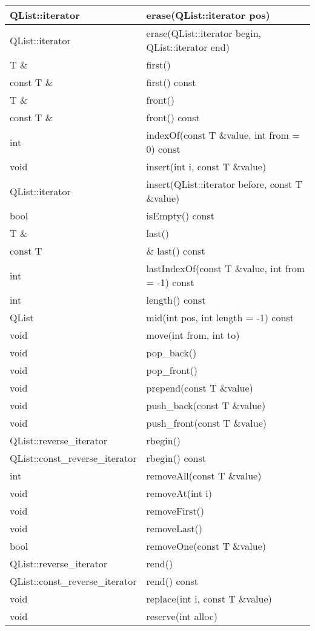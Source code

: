 \begin{longtable}{|l|m{25em}|}
\hline
QList::iterator &	erase(QList::iterator pos)\\
\hline
QList::iterator &	erase(QList::iterator begin, QList::iterator
                  end)\\
\hline
T \& &	first()\\
\hline
const T \& &	first() const\\
\hline
T \& &	front()\\
\hline
const T \& & 	front() const\\
\hline
int &	indexOf(const T \&value, int from = 0) const\\
\hline
void &	insert(int i, const T \&value)\\
\hline
QList::iterator& 	insert(QList::iterator before, const T \&value)\\
\hline
bool 	&isEmpty() const\\
\hline
T \& &	last()\\
\hline
const T& \& 	last() const\\
\hline
int &	lastIndexOf(const T \&value, int from = -1) const\\
\hline
int 	&length() const\\
\hline
QList& 	mid(int pos, int length = -1) const\\
\hline
void& 	move(int from, int to)\\
\hline
void& 	pop\_back()\\
\hline
void& 	pop\_front()\\
\hline
void& 	prepend(const T \&value)\\
\hline
void& 	push\_back(const T \&value)\\
\hline
void& 	push\_front(const T \&value)\\
\hline
QList::reverse\_iterator &	rbegin()\\
\hline
QList::const\_reverse\_iterator &	rbegin() const\\
\hline
int& 	removeAll(const T \&value)\\
\hline
void& 	removeAt(int i)\\
\hline
void& 	removeFirst()\\
\hline
void& 	removeLast()\\
\hline
bool& 	removeOne(const T \&value)\\
\hline
QList::reverse\_iterator &	rend()\\
\hline
QList::const\_reverse\_iterator &	rend() const\\
\hline
void& 	replace(int i, const T \&value)\\
\hline
void& 	reserve(int alloc)\\

\end{longtable}

